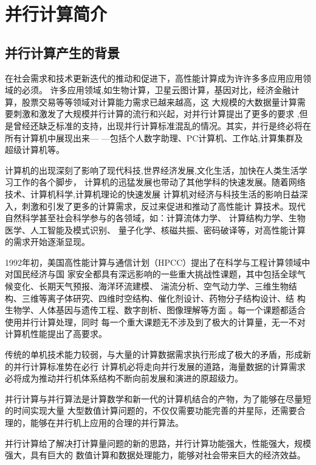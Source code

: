 
\chapter[并行计算简介]{并行计算简介}
\section{并行计算产生的背景}

在社会需求和技术更新迭代的推动和促进下，高性能计算成为许许多多应用应用领域的必须。
许多应用领域,如生物计算，卫星云图计算，基因对比，经济金融计算，股票交易等等领域对计算能力需求已越来越高，这
大规模的大数据量计算需要刺激和激发了大规模并行计算的流行和兴起，对并行计算提出了更多的要求
,但是曾经还缺乏标准的支持，出现并行计算标准混乱的情况。其实，并行是终必将在所有计算机中展现出来—
—包括个人数字助理、PC计算机、工作站,计算集群及超级计算机等。

计算机的出现深刻了影响了现代科技,世界经济发展,文化生活，加快在人类生活学习工作的各个脚步，
计算机的迅猛发展也带动了其他学科的快速发展。随着网络技术、计算机科学,计算机理论的快速发展
计算机对经济与科技生活的影响日益深入，刺激和引发了更多的计算需求，反过来促进和推动了高性能计
算技术。现代自然科学甚至社会科学参与的各领域，如：计算流体力学、 计算结构力学、生物医学、人工智能及模式识别、
量子化学、核磁共振、密码破译等，对高性能计算的需求开始逐渐显现。

1992年初，美国高性能计算与通信计划（HPCC）提出了在科学与工程计算领域中对国民经济与国
家安全都具有深远影响的一些重大挑战性课题，其中包括全球气候变化、长期天气预报、海洋环流建模、
湍流分析、空气动力学、三维生物结构、三维等离子体研究、四维时空结构、催化剂设计、药物分子结构设计、结
构生物学、人体基因与遗传工程、数字剖析、图像理解等方面 \cite{Daibo} 。每一个课题都适合使用并行计算处理，同时
每一个重大课题无不涉及到了极大的计算量，无一不对计算机性能提出了高要求。

传统的单机技术能力较弱，与大量的计算数据需求执行形成了极大的矛盾，形成新的并行计算标准势在必行
计算机必将走向并行发展的道路，海量数据的计算需求必将成为推动并行机体系结构不断向前发展和演进的原超级力。

并行计算与并行算法是计算数学和新一代的计算机结合的产物，为了能够在尽量短的时间实现大量
大型数值计算问题的，不仅仅需要功能完善的并星际，还需要合理的，能够在并行机上应用的合理的并行算法。

并行计算给了解决打计算量问题的新的思路，并行计算功能强大，性能强大，规模强大，具有巨大的
数值计算和数据处理能力，能够对社会带来巨大的经济效益。   

